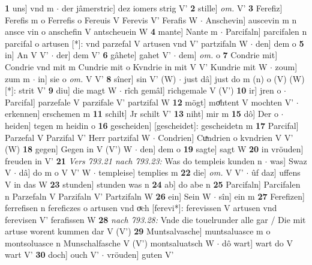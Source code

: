 \documentclass[8pt,a4paper,notitlepage]{article}
\begin{document}
\begin{table}[ht]
\begin{minipage}[t]{0.5\linewidth}
\textbf{1} uns] vnd m  $\cdot$ der jâmerstric] dez iomers strig V' \textbf{2} stille] \textit{om.} V' \textbf{3} Ferefiz] Ferefis m o Ferrefis o Fereuis V Ferevis V' Ferafis W  $\cdot$ Anschevin] auscevin m n ansce vin o anschefin V antscheuein W \textbf{4} mante] Nante m  $\cdot$ Parcifaln] parcifalen n parcifal o artusen [*]: vnd parzefal V artusen vnd V' partzifaln W  $\cdot$ den] dem o \textbf{5} in] An V V'  $\cdot$ der] dem V' \textbf{6} gâhete] gahet V'  $\cdot$ dem] \textit{om.} o \textbf{7} Condrie mit] Condrie vnd mit m Cundrie mit o Kvndrie in mit V V' Kundrie mit W  $\cdot$ zoum] zum m  $\cdot$ in] sie o \textit{om.} V V' \textbf{8} sîner] sin V' (W)  $\cdot$ just dâ] just do m (n) o (V) (W) [*]: strit  V' \textbf{9} diu] die magt W  $\cdot$ rîch gemâl] richgemale V (V') \textbf{10} ir] jren o  $\cdot$ Parcifal] parzefale V parzifale V' partzifal W \textbf{12} mögt] moͤhtent V mochten V'  $\cdot$ erkennen] erschemen m \textbf{11} schilt] Jr schilt V' \textbf{13} niht] mir m \textbf{15} dô] Der o  $\cdot$ heiden] tegen m heidin o \textbf{16} gescheiden] [gescheidet]: gescheidetn m \textbf{17} Parcifal] Parzefal V Parzifal V' Herr partzifal W  $\cdot$ Condrien] Cuͯndrien o kvndrien V V' (W) \textbf{18} gegen] Gegen in V (V') W  $\cdot$ den] dem o \textbf{19} sagte] sagt W \textbf{20} in vröuden] freuden in V' \textbf{21} \textit{Vers 793.21 nach 793.23:} Was do templeis kunden n   $\cdot$ was] Swaz V  $\cdot$ dâ] do m o V V' W  $\cdot$ templeise] templies m \textbf{22} die] \textit{om.} V V'  $\cdot$ ûf daz] uffens V in das W \textbf{23} stunden] stunden was n \textbf{24} ab] do abe n \textbf{25} Parcifaln] Parcifalen n Parzefaln V Parzifaln V' Partzifaln W \textbf{26} ein] Sein W  $\cdot$ sîn] ein m \textbf{27} Ferefizen] ferrefisen n fereficzes o artusen vnd oͮch [ferevi*]: ferevissen V artusen vnd ferevisen V' ferafissen W \textbf{28} \textit{nach 793.28:} Vnde die touelrunder alle gar / Die mit artuse worent kummen dar V (V')  \textbf{29} Muntsalvasche] muntsaluasce m o montsoluasce n Munschalfasche V (V') montsaluatsch W  $\cdot$ dô wart] wart do V wart V' \textbf{30} doch] ouch V'  $\cdot$ vröuden] guten V' \newline
\end{minipage}
\end{table}
\newpage
\end{document}
